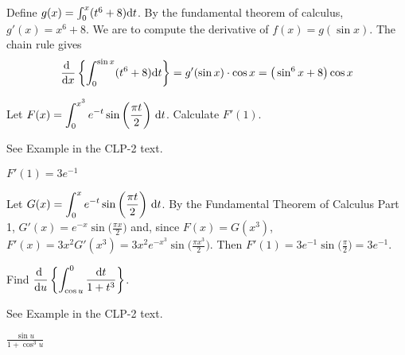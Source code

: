 \begin{solution}
Define $g(x)=\int_0^x (t^6+8)\mathrm{d}t$. By the fundamental
theorem of calculus, $g'(x)=x^6+8$. We are to compute the derivative of $f(x)=g(\sin x)$. The chain rule gives
\begin{align*}
\diff{}{x}\left\{\int_0^{\sin x}(t^6+8)\dee{t}\right\}
  =g'(\sin x)\cdot \cos x=\big(\sin^6 x+8\big)\cos x
\end{align*}
\end{solution}


\begin{question}[2000D]
Let $F(x)= \displaystyle\int_0^{x^3}e^{-t}\sin\left(\frac{\pi t}{2}\right)\,\mathrm{d}t$.
Calculate $F'(1)$.
\end{question}

\begin{hint}
See Example  in the
CLP-2 text.
\end{hint}

\begin{answer}
$F'(1)=3e^{-1}$
\end{answer}

\begin{solution}
Let $G(x)= \displaystyle\int_0^{x}e^{-t}\sin\left(\frac{\pi t}{2}\right)\,\mathrm{d}t$.
By the Fundamental Theorem of Calculus Part 1,  $G'(x)=e^{-x}\sin\big(\frac{\pi x}{2}\big)$ and,
since $F(x)=G(x^3)$,
$F'(x)=3x^2G'(x^3)=3x^2e^{-x^3}\sin\big(\frac{\pi x^3}{2}\big)$. Then
$F'(1)=3e^{-1}\sin\big(\frac{\pi }{2}\big)
=3e^{-1}$.
\end{solution}

\begin{question}[2016Q2]
Find $\displaystyle \diff{}{u} \left\{ \int_{\cos u}^0 \frac{\dee{t}}{1+t^3}
\right\}$.
\end{question}

\begin{hint}
See Example  in the
CLP-2 text.
\end{hint}

\begin{answer}
$\displaystyle{}\frac{\sin{u}}{1+\cos^3 u}$
\end{answer}

